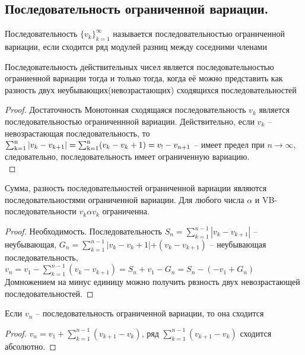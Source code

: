 \subsection*{Последовательность ограниченной вариации.}
\begin{deff}
Последовательность $\{v_k\}_{k=1}^{\infty}$ называется последовательностью ограниченной вариации, если сходится ряд модулей разниц между соседними членами
\end{deff}
\begin{thm}
Последовательность действительных чисел  является последовательностью ограниенной вариации тогда и только тогда, когда её можно представить как разность двух неубывающих(невозрастающих) сходящихся последовательностей
\end{thm}
\begin{proof}
Достаточность
Монотонная сходящаяся последовательность $v_k$ является последовательностью ограниченнной вариации. Действительно, если $v_k$ -- невозрастающая последовательность, то $\operatorname{\sum_{k=1}^{n}} |v_k-v_{k+1}| = \operatorname{\sum_{k=1}^{n}}(v_k-v_k+1)= v_!-v_{n+1}$
-- имеет предел при $n \to  \infty$, следовательно, последовательность имеет ограниченную вариацию.\\
\end{proof}
Сумма, разность последовательностей ограниченной вариации являются последовательностями ограниченной вариации. Для любого числа $\alpha$ и VB-последовательности $v_k \alpha v_k$ ограниченна.
\begin{proof}
Необходимость. Последовательность $S_n = \sum_{k=1}^{n-1} |v_k-v_{k+1}|$ -- неубывающая, $G_n = \sum_{k=1}^{n-1} \big |v_k -v_k+1|+(v_k-v_{k+1})$ -- неубывающая последовательность, $v_n = v_1 - \sum _{k=1}^{n-1}(v_k - v_{k+1})= S_n + v_1 - G_n=S_n -(-v_1 + G_n)$
Домножением на минус единицу можно получить рвзность двух невозрастающей последовательностей.
\end{proof}
\begin{thm}
Если $v_n$ -- последовательность ограниченной вариации, то она сходится
\end{thm}
\begin{proof}
$ v_n = v_1 + \sum_{k=1}^{n-1}(v_{k+1} - v_k)$, ряд $\sum_{k=1}^{n-1}( v_{k+1} - v_k) $ сходится абсолютно.
\end{proof}